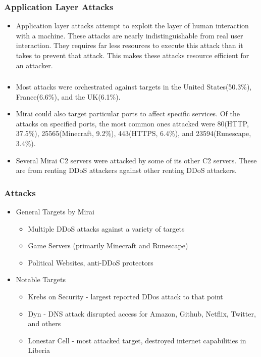 \documentclass{beamer}
\begin{document}
\begin{frame}
    \frametitle{Application Layer Attacks}
        \begin{itemize}
            \item<+-> Application layer attacks attempt to exploit the layer of human interaction with a machine. These attacks are nearly indistinguishable from real user interaction. They requires far less resources to execute this attack than it takes to prevent that attack. This makes these attacks resource efficient for an attacker.
    \end{itemize}
\end{frame}
\begin{frame}
    \frametitle{}
    \begin{itemize}
        \item<+-> Most attacks were orchestrated against targets in the United States(50.3\%), France(6.6\%), and the UK(6.1\%).
        \item<+-> Mirai could also target particular ports to affect specific services. Of the attacks on specified ports, the most common ones attacked were 80(HTTP, 37.5\%), 25565(Minecraft, 9.2\%), 443(HTTPS, 6.4\%), and 23594(Runescape, 3.4\%).
        \item<+-> Several Mirai C2 servers were attacked by some of its other C2 servers. These are from renting DDoS attackers against other renting DDoS attackers.
    \end{itemize}
\end{frame}

\begin{frame}
    \frametitle{Attacks}
	\begin{itemize}
		\item<+->General Targets by Mirai
			\begin{itemize}
				\item<+-> Multiple DDoS attacks against a variety of targets
				\item<+-> Game Servers (primarily Minecraft and Runescape)
				\item<+-> Political Websites, anti-DDoS protectors
			\end{itemize}
		\item<+-> Notable Targets
			\begin{itemize}
				\item<+-> Krebs on Security - largest reported DDos attack to that point
				\item<+-> Dyn - DNS attack disrupted access for Amazon, Github, Netflix, Twitter, and others
				\item<+-> Lonestar Cell - most attacked target, destroyed internet capabilities in Liberia
			\end{itemize}
	\end{itemize}
\end{frame}
\end{document}
